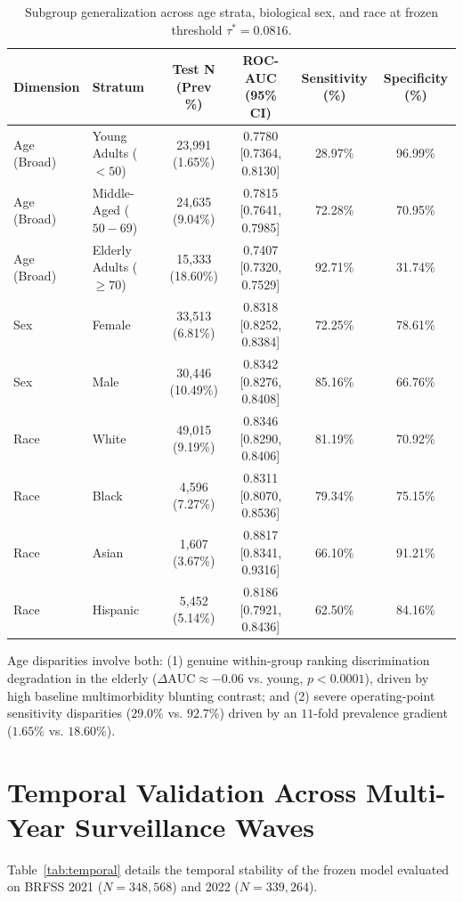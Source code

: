\documentclass[11pt,a4paper]{article}
\begin{document}
\begin{table}[htbp]
\centering
\small
\caption{Subgroup generalization across age strata, biological sex, and race at frozen threshold $\tau^* = 0.0816$.}
\label{tab:subgroups}
\begin{tabular}{llcccc}
\toprule
Dimension & Stratum & Test N (Prev \%) & ROC-AUC (95\% CI) & Sensitivity (\%) & Specificity (\%) \\
\midrule
Age (Broad) & Young Adults ($<50$) & 23,991 (1.65\%) & 0.7780 [0.7364, 0.8130] & 28.97\% & 96.99\% \\
Age (Broad) & Middle-Aged ($50-69$) & 24,635 (9.04\%) & 0.7815 [0.7641, 0.7985] & 72.28\% & 70.95\% \\
Age (Broad) & Elderly Adults ($\ge 70$) & 15,333 (18.60\%) & 0.7407 [0.7320, 0.7529] & 92.71\% & 31.74\% \\
\midrule
Sex & Female & 33,513 (6.81\%) & 0.8318 [0.8252, 0.8384] & 72.25\% & 78.61\% \\
Sex & Male & 30,446 (10.49\%) & 0.8342 [0.8276, 0.8408] & 85.16\% & 66.76\% \\
\midrule
Race & White & 49,015 (9.19\%) & 0.8346 [0.8290, 0.8406] & 81.19\% & 70.92\% \\
Race & Black & 4,596 (7.27\%) & 0.8311 [0.8070, 0.8536] & 79.34\% & 75.15\% \\
Race & Asian & 1,607 (3.67\%) & 0.8817 [0.8341, 0.9316] & 66.10\% & 91.21\% \\
Race & Hispanic & 5,452 (5.14\%) & 0.8186 [0.7921, 0.8436] & 62.50\% & 84.16\% \\
\bottomrule
\end{tabular}
\end{table}

Age disparities involve both: (1) genuine within-group ranking discrimination degradation in the elderly ($\Delta \text{AUC} \approx -0.06$ vs. young, $p < 0.0001$), driven by high baseline multimorbidity blunting contrast; and (2) severe operating-point sensitivity disparities ($29.0\%$ vs. $92.7\%$) driven by an $11$-fold prevalence gradient ($1.65\%$ vs. $18.60\%$).

\section{Temporal Validation Across Multi-Year Surveillance Waves}

Table~\ref{tab:temporal} details the temporal stability of the frozen model evaluated on BRFSS 2021 ($N = 348,568$) and 2022 ($N = 339,264$).
\end{document}
